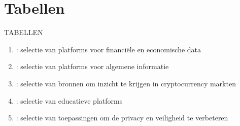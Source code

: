 \chapter{Tabellen}
\label{app:A}

\begin{cryptobox}{TABELLEN}
\begin{enumerate}
\setlength\itemsep{0em}
    \item {}: selectie van platforms voor financi\"ele en economische data   
    \item {}: selectie van platforms voor algemene informatie
    \item {}: selectie van bronnen om inzicht te krijgen in cryptocurrency markten
    \item {}: selectie van educatieve platforms
    \item {}: selectie van toepassingen om de privacy en veiligheid te verbeteren
\end{enumerate}
\end{cryptobox}
\clearpage




